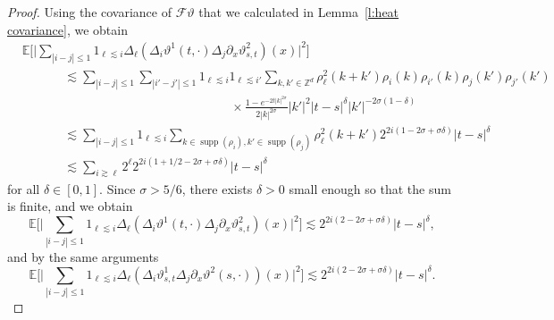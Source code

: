 \documentclass[11pt,a4paper]{article}
\newcommand{\tmop}[1]{\ensuremath{\operatorname{#1}}}
\theoremstyle{remark}
\newcommand{\E}{\mathbb{E}}
\newcommand{\CF}{\ensuremath{\mathscr{F}}}
\begin{document}
\begin{proof}
   Using the covariance of $\CF \vartheta$ that we calculated in Lemma~\ref{l:heat covariance}, we obtain
   \begin{align*}
      &\E\biggl[\biggl|\sum_{|i-j| \leqslant 1} 1_{\ell \lesssim i} \Delta_{\ell} ( \Delta_i \vartheta^1(t,\cdot) \Delta_j \partial_x \vartheta^2_{s,t})(x)\biggr|^2\biggr] \\
      &\hspace{40pt} \lesssim \sum_{| i - j | \leqslant 1} \sum_{| i' - j' | \leqslant 1} 1_{\ell \lesssim i} 1_{\ell \lesssim i'} \sum_{k, k' \in \mathbb{Z}^d} \rho_{\ell}^2 (k+k') \rho_i ( k ) \rho_{i'} ( k ) \rho_j (k') \rho_{j'}(k')\\
      &\hspace{200pt} \times \frac{1 - e^{-2t|k|^{2\sigma}}}{2 |k|^{2 \sigma}} |k'|^2 |t-s|^{\delta} |k'|^{-2\sigma(1 - \delta)}\\
      &\hspace{40pt} \lesssim \sum_{| i - j | \leqslant 1} 1_{\ell \lesssim i} \sum_{k \in \tmop{supp} ( \rho_i ), k' \in \tmop{supp} ( \rho_j )} \rho_{\ell}^2 ( k + k' ) 2^{2i(1 - 2\sigma + \sigma \delta)} |t-s|^{\delta} \\
      &\hspace{40pt} \lesssim \sum_{i \gtrsim \ell} 2^\ell 2^{2i(1 + 1/2 - 2\sigma + \sigma\delta)} |t-s|^{\delta} 
   \end{align*}
   for all $\delta \in [0,1]$. Since $\sigma > 5/6$, there exists $\delta >0$ small enough so that the sum is finite, and we obtain
   \[
      \E\biggl[\biggl|\sum_{|i-j| \leqslant 1} 1_{\ell \lesssim i} \Delta_{\ell} ( \Delta_i \vartheta^1(t,\cdot) \Delta_j \partial_x \vartheta^2_{s,t})(x)\biggr|^2\biggr]  \lesssim 2^{2i(2 - 2\sigma + \sigma \delta)}  |t-s|^{\delta},
   \]
   and by the same arguments
   \[
      \E\biggl[\biggl|\sum_{|i-j| \leqslant 1} 1_{\ell \lesssim i} \Delta_{\ell} ( \Delta_i \vartheta^1_{s,t} \Delta_j \partial_x \vartheta^2(s,\cdot))(x)\biggr|^2\biggr]  \lesssim 2^{2i(2 - 2\sigma + \sigma \delta)}  |t-s|^{\delta}.
   \]   
%   
%   

\end{proof}
\end{document}
